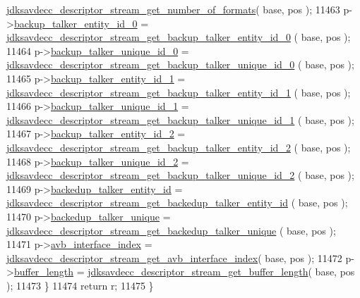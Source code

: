 \begin{DoxyCode}
      \hyperlink{group__descriptor__stream_gaeb76e60867af744978aafba4150e1f83}{jdksavdecc\_descriptor\_stream\_get\_number\_of\_formats}( base,
       pos );
11463         p->\hyperlink{structjdksavdecc__descriptor__stream_a6d81901ba67de7a8dd9891bdec2d6bb0}{backup\_talker\_entity\_id\_0} = 
      \hyperlink{group__descriptor__stream_gabd7d75877fef327e19ce52f15ca69bf5}{jdksavdecc\_descriptor\_stream\_get\_backup\_talker\_entity\_id\_0}
      ( base, pos );
11464         p->\hyperlink{structjdksavdecc__descriptor__stream_ad46a052a08dd413492ed8c2e049217df}{backup\_talker\_unique\_id\_0} = 
      \hyperlink{group__descriptor__stream_ga09b50d193cab1d10e356f8516e2e9c4a}{jdksavdecc\_descriptor\_stream\_get\_backup\_talker\_unique\_id\_0}
      ( base, pos );
11465         p->\hyperlink{structjdksavdecc__descriptor__stream_a5bfc8679d650a72f4441cc8e5327c59c}{backup\_talker\_entity\_id\_1} = 
      \hyperlink{group__descriptor__stream_ga42b7f2e287b4be0aff42464ba69a9c89}{jdksavdecc\_descriptor\_stream\_get\_backup\_talker\_entity\_id\_1}
      ( base, pos );
11466         p->\hyperlink{structjdksavdecc__descriptor__stream_a06bead97e1d1c042d2a9da6c5efb5108}{backup\_talker\_unique\_id\_1} = 
      \hyperlink{group__descriptor__stream_ga265da4603d296982b48396849793ce68}{jdksavdecc\_descriptor\_stream\_get\_backup\_talker\_unique\_id\_1}
      ( base, pos );
11467         p->\hyperlink{structjdksavdecc__descriptor__stream_a8cd30b747ffe42bbbb9e89686bfe349e}{backup\_talker\_entity\_id\_2} = 
      \hyperlink{group__descriptor__stream_gab3addd377a0cb8b941f948d6256d4b2a}{jdksavdecc\_descriptor\_stream\_get\_backup\_talker\_entity\_id\_2}
      ( base, pos );
11468         p->\hyperlink{structjdksavdecc__descriptor__stream_a97e0bf5439ef92d3caaf24ce5d5bcb7e}{backup\_talker\_unique\_id\_2} = 
      \hyperlink{group__descriptor__stream_gac89567fb070ba9e25982371c1934adf7}{jdksavdecc\_descriptor\_stream\_get\_backup\_talker\_unique\_id\_2}
      ( base, pos );
11469         p->\hyperlink{structjdksavdecc__descriptor__stream_a218e3249603c8b6c32ed14bbbb1e0b30}{backedup\_talker\_entity\_id} = 
      \hyperlink{group__descriptor__stream_ga3e509b00c0913a03e5a5d9fcc658eb53}{jdksavdecc\_descriptor\_stream\_get\_backedup\_talker\_entity\_id}
      ( base, pos );
11470         p->\hyperlink{structjdksavdecc__descriptor__stream_a771e4d5f3cd01acbe4a885e46a888722}{backedup\_talker\_unique} = 
      \hyperlink{group__descriptor__stream_ga0004f622f31aa654e913b0f37dc620f6}{jdksavdecc\_descriptor\_stream\_get\_backedup\_talker\_unique}
      ( base, pos );
11471         p->\hyperlink{structjdksavdecc__descriptor__stream_aabf36ae1d50a1f7310c54c6b30a2a62d}{avb\_interface\_index} = 
      \hyperlink{group__descriptor__stream_ga8d7737072e637ae7ba6c607e9907893a}{jdksavdecc\_descriptor\_stream\_get\_avb\_interface\_index}( 
      base, pos );
11472         p->\hyperlink{structjdksavdecc__descriptor__stream_add2e144e8eb02e9b6cce22e494b64db6}{buffer\_length} = 
      \hyperlink{group__descriptor__stream_ga21c0239d391fb8724d6f025ab90e0263}{jdksavdecc\_descriptor\_stream\_get\_buffer\_length}( base, pos );
11473     \}
11474     \textcolor{keywordflow}{return} r;
11475 \}
\end{DoxyCode}


